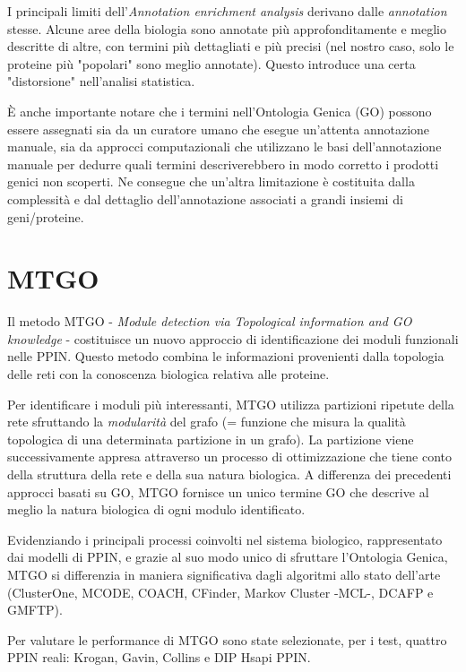 \documentclass[11pt]{article}
\begin{document}
I principali limiti dell'\textit{Annotation enrichment analysis} derivano dalle \textit{annotation} stesse. Alcune aree della biologia sono annotate più approfonditamente e meglio descritte di altre, con termini più dettagliati e più precisi (nel nostro caso, solo le proteine più "popolari" sono meglio annotate). Questo introduce una certa "distorsione" nell'analisi statistica.

È anche importante notare che i termini nell'Ontologia Genica (GO) possono essere assegnati sia da un curatore umano che esegue un'attenta annotazione manuale, sia da approcci computazionali che utilizzano le basi dell'annotazione manuale per dedurre quali termini descriverebbero in modo corretto i prodotti genici non scoperti. Ne consegue che un'altra limitazione è costituita dalla complessità e dal dettaglio dell'annotazione associati a grandi insiemi di geni/proteine. 

\pagebreak
\section{MTGO}
Il metodo MTGO - \textit{Module detection via Topological information and GO knowledge} - costituisce un nuovo approccio di identificazione dei moduli funzionali nelle PPIN. Questo metodo combina le informazioni provenienti dalla topologia delle reti con la conoscenza biologica relativa alle proteine.
 
Per identificare i moduli più interessanti, MTGO utilizza partizioni ripetute della rete sfruttando la \textit{modularità} del grafo (= funzione che misura la qualità topologica di una determinata partizione in un grafo). La partizione viene successivamente appresa attraverso un processo di ottimizzazione che tiene conto della struttura della rete e della sua natura biologica. A differenza dei precedenti approcci basati su GO, MTGO fornisce un unico termine GO che descrive al meglio la natura biologica di ogni modulo identificato.

Evidenziando i principali processi coinvolti nel sistema biologico, rappresentato dai modelli di PPIN, e grazie al suo modo unico di sfruttare l'Ontologia Genica, MTGO si differenzia in maniera significativa dagli algoritmi allo stato dell'arte (ClusterOne, MCODE, COACH, CFinder, Markov Cluster -MCL-, DCAFP e GMFTP). 

Per valutare le performance di MTGO sono state selezionate, per i test, quattro PPIN reali: Krogan, Gavin, Collins e DIP Hsapi PPIN.
\end{document}
